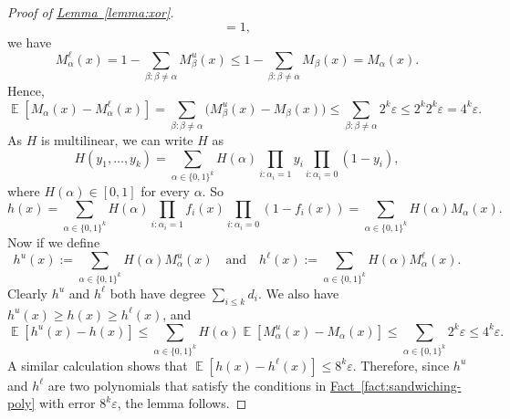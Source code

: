\documentclass[11pt]{article}
\numberwithin{equation}{section}
\theoremstyle{definition}
\theoremstyle{plain}
\newcommand{\expref}[2]{\hyperref[#2]{#1~\ref{#2}}}
\newcommand{\zo}{\{0,1\}}
\def\eps{\varepsilon}
\DeclareMathOperator*{\E}{\mathbb{E}}                 %
\begin{document}
\begin{proof}[Proof of {\expref{Lemma}{lemma:xor}}]
\[      = 1 ,
    \]
    we have 
    \[
      M_\alpha^{\ell}(x) = 1 - \sum_{\beta: \beta \neq \alpha} M_\beta^{u}(x)
      \le 1 - \sum_{\beta: \beta \neq \alpha} M_\beta(x)
      = M_\alpha(x) .
    \]
    Hence,
    \[
      \E[M_\alpha(x) - M_\alpha^\ell(x)]
      = \sum_{\beta: \beta \neq \alpha} \bigl( M_\beta^u(x) - M_\beta(x) \bigr)
      \le \sum_{\beta: \beta \neq \alpha} 2^k \eps
      \le 2^k 2^k \eps
      = 4^k \eps .
    \]
    As $H$ is multilinear, we can write $H$ as
    \[
      H(y_1, \ldots, y_k)
      = \sum_{\alpha \in \zo^k} H(\alpha) \prod_{i: \alpha_i = 1} y_i \prod_{i: \alpha_i = 0} (1 - y_i) ,
    \]
    where $H(\alpha) \in [0,1]$ for every $\alpha$.
    So
    \[
      h(x)
      = \sum_{\alpha \in \zo^k} H(\alpha) \prod_{i:\alpha_i = 1} f_i(x) \prod_{i: \alpha_i = 0} (1 - f_i(x))
      = \sum_{\alpha \in \zo^k} H(\alpha) M_\alpha(x) .
    \]
    Now if we define 
    \[
      h^u(x) := \sum_{\alpha \in \zo^k} H(\alpha) M_\alpha^u(x)
    \quad\text{and}\quad
      h^\ell(x) := \sum_{\alpha \in \zo^k} H(\alpha) M_\alpha^\ell(x) .
    \]
    Clearly $h^u$ and $h^\ell$ both have degree $\sum_{i\le k} d_i$.
    We also have $h^u(x) \ge h(x) \ge h^\ell(x)$, and 
    \[
      \E[h^u(x) - h(x)]
      \le \sum_{\alpha \in \zo^k} H(\alpha) \E[M_\alpha^u(x) - M_\alpha(x)]
      \le \sum_{\alpha \in \zo^k} 2^k \eps
      \le 4^k \eps.
    \]
    A similar calculation shows that $\E[h(x) - h^\ell(x)] \le 8^k \eps$.
    Therefore, since $h^u$ and $h^\ell$ are two polynomials that satisfy the conditions in \expref{Fact}{fact:sandwiching-poly} with error $8^k \eps$, the lemma follows.
  \end{proof}
  
\end{document}

